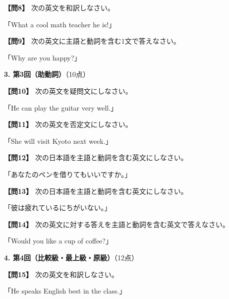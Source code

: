 \testquestion
\noindent\textbf{【問8】} 次の英文を和訳しなさい。

\noindent「What a cool math teacher he is!」

\testqsep

\testquestion
\noindent\textbf{【問9】} 次の英文に主語と動詞を含む1文で答えなさい。

\noindent「Why are you happy?」

\testqsep

\testsectsep
\noindent\textbf{3. 第3回（助動詞）}（10点）

\testquestion
\noindent\textbf{【問10】} 次の英文を疑問文にしなさい。

\noindent「He can play the guitar very well.」

\testqsep

\testquestion
\noindent\textbf{【問11】} 次の英文を否定文にしなさい。

\noindent「She will visit Kyoto next week.」

\testqsep

\testquestion
\noindent\textbf{【問12】} 次の日本語を主語と動詞を含む英文にしなさい。

\noindent「あなたのペンを借りてもいいですか。」

\testqsep

\testquestion
\noindent\textbf{【問13】} 次の日本語を主語と動詞を含む英文にしなさい。

\noindent「彼は疲れているにちがいない。」

\testqsep

\testquestion
\noindent\textbf{【問14】} 次の英文に対する答えを主語と動詞を含む英文で答えなさい。

\noindent「Would you like a cup of coffee?」

\testqsep

\testsectsep
\noindent\textbf{4. 第4回（比較級・最上級・原級）}（12点）

\testquestion
\noindent\textbf{【問15】} 次の英文を和訳しなさい。

\noindent「He speaks English best in the class.」

\testqsep

